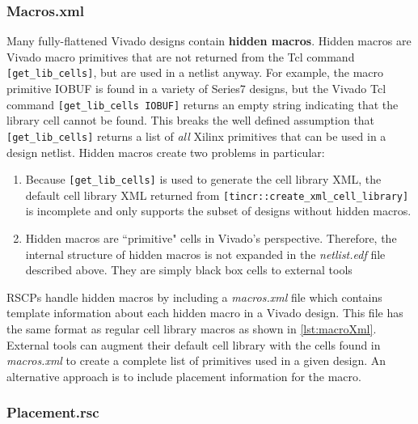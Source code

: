 \subsubsection{Macros.xml} \label{sec:macrosRscp}

Many fully-flattened Vivado designs contain \textbf{hidden macros}. Hidden
macros are Vivado macro primitives that are not returned from the Tcl command
\texttt{[get\_lib\_cells]}, but are used in a netlist anyway. For example, the
macro primitive IOBUF is found in a variety of Series7 designs, but
the Vivado Tcl command \texttt{[get\_lib\_cells IOBUF]} returns an empty string
indicating that the library cell cannot be found. This breaks the well defined
assumption that \texttt{[get\_lib\_cells]} returns a list of \textit{all}
Xilinx primitives that can be used in a design netlist. Hidden macros create two
problems in particular:

\begin{enumerate}
  \item Because \texttt{[get\_lib\_cells]} is used to generate the cell library
   XML, the default cell library XML returned from
   \texttt{[tincr::create\_xml\_cell\_library]} is incomplete and only supports
   the subset of designs without hidden macros.
   \item Hidden macros are ``primitive" cells in Vivado's perspective.
   Therefore, the internal structure of hidden macros is not expanded in the
   \textit{netlist.edf} file described above. They are simply black box cells to
   external tools
\end{enumerate}

RSCPs handle hidden macros by including a \textit{macros.xml} file
which contains template information about each hidden macro in a Vivado design.
This file has the same format as regular cell library macros as shown in
\autoref{lst:macroXml}. External tools can augment their default cell library with
the cells found in \textit{macros.xml} to create a complete list of
primitives used in a given design. An alternative approach is to include
placement information for the macro. 


\subsubsection{Placement.rsc}

